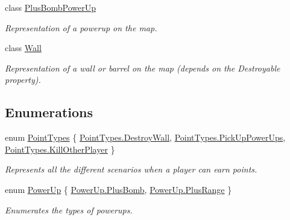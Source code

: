 \begin{DoxyCompactItemize}
class \mbox{\hyperlink{class_bomberman_1_1_model_1_1_plus_bomb_power_up}{Plus\+Bomb\+Power\+Up}}
\begin{DoxyCompactList}\small\item\em Representation of a powerup on the map. \end{DoxyCompactList}\item 
class \mbox{\hyperlink{class_bomberman_1_1_model_1_1_wall}{Wall}}
\begin{DoxyCompactList}\small\item\em Representation of a wall or barrel on the map (depends on the Destroyable property). \end{DoxyCompactList}\end{DoxyCompactItemize}
\subsection*{Enumerations}
\begin{DoxyCompactItemize}
\item 
enum \mbox{\hyperlink{namespace_bomberman_1_1_model_ae2cd98abbbc849107bf2802cb1e7a8a3}{Point\+Types}} \{ \mbox{\hyperlink{namespace_bomberman_1_1_model_ae2cd98abbbc849107bf2802cb1e7a8a3a95056537bca5e0700240da330c33f1a2}{Point\+Types.\+Destroy\+Wall}}, 
\mbox{\hyperlink{namespace_bomberman_1_1_model_ae2cd98abbbc849107bf2802cb1e7a8a3abb45b82490a572ef088adf870327a923}{Point\+Types.\+Pick\+Up\+Power\+Ups}}, 
\mbox{\hyperlink{namespace_bomberman_1_1_model_ae2cd98abbbc849107bf2802cb1e7a8a3a14e161ef2d3d0bb9532803e701578c39}{Point\+Types.\+Kill\+Other\+Player}}
 \}
\begin{DoxyCompactList}\small\item\em Represents all the different scenarios when a player can earn points. \end{DoxyCompactList}\item 
enum \mbox{\hyperlink{namespace_bomberman_1_1_model_a698c97744bc885fe16cc6f385fc501ef}{Power\+Up}} \{ \mbox{\hyperlink{namespace_bomberman_1_1_model_a698c97744bc885fe16cc6f385fc501efa175c9c587bfe0d4887e1401c8df4f181}{Power\+Up.\+Plus\+Bomb}}, 
\mbox{\hyperlink{namespace_bomberman_1_1_model_a698c97744bc885fe16cc6f385fc501efa0db7259f75c4c771f1c1ac569d6cac95}{Power\+Up.\+Plus\+Range}}
 \}
\begin{DoxyCompactList}\small\item\em Enumerates the types of powerups. \end{DoxyCompactList}\end{DoxyCompactItemize}


